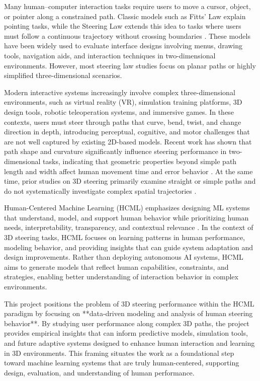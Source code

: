 \documentclass[sigconf]{acmart}
\begin{document}
Many human--computer interaction tasks require users to move a cursor, object, or pointer along a constrained path. Classic models such as Fitts' Law explain pointing tasks, while the Steering Law extends this idea to tasks where users must follow a continuous trajectory without crossing boundaries \cite{accot1997beyond}. These models have been widely used to evaluate interface designs involving menus, drawing tools, navigation aids, and interaction techniques in two-dimensional environments. However, most steering law studies focus on planar paths or highly simplified three-dimensional scenarios.

Modern interactive systems increasingly involve complex three-dimensional environments, such as virtual reality (VR), simulation training platforms, 3D design tools, robotic teleoperation systems, and immersive games. In these contexts, users must steer through paths that curve, bend, twist, and change direction in depth, introducing perceptual, cognitive, and motor challenges that are not well captured by existing 2D-based models. Recent work has shown that path shape and curvature significantly influence steering performance in two-dimensional tasks, indicating that geometric properties beyond simple path length and width affect human movement time and error behavior \cite{chen2025curves}. At the same time, prior studies on 3D steering primarily examine straight or simple paths and do not systematically investigate complex spatial trajectories \cite{liu2011revisiting}.

Human-Centered Machine Learning (HCML) emphasizes designing ML systems that understand, model, and support human behavior while prioritizing human needs, interpretability, transparency, and contextual relevance \cite{shneiderman2022hcai}. In the context of 3D steering tasks, HCML focuses on learning patterns in human performance, modeling behavior, and providing insights that can guide system adaptation and design improvements. Rather than deploying autonomous AI systems, HCML aims to generate models that reflect human capabilities, constraints, and strategies, enabling better understanding of interaction behavior in complex environments.

This project positions the problem of 3D steering performance within the HCML paradigm by focusing on **data-driven modeling and analysis of human steering behavior**. By studying user performance along complex 3D paths, the project provides empirical insights that can inform predictive models, simulation tools, and future adaptive systems designed to enhance human interaction and learning in 3D environments. This framing situates the work as a foundational step toward machine learning systems that are truly human-centered, supporting design, evaluation, and understanding of human performance.
\end{document}
